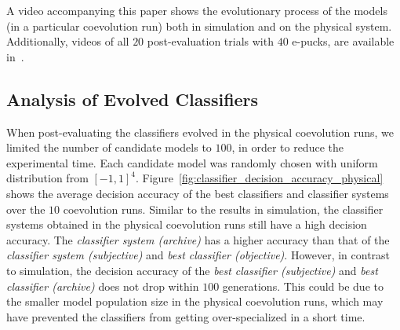 A video accompanying this paper shows the evolutionary process of the models (in a particular coevolution run) both in simulation and on the physical system. Additionally, videos of all $20$ post-evaluation trials with $40$ e-pucks, are available in~\cite{online_supplementary_material_tevc2014}.

\subsection{Analysis of Evolved Classifiers}\label{sec:analysis_evolved_classifier_physical_swarm}

When post-evaluating the classifiers evolved in the physical coevolution runs, we limited the number of candidate models to $100$, in order to reduce the experimental time. Each candidate model was randomly chosen with uniform distribution from $[-1,1]^4$. Figure~\ref{fig:classifier_decision_accuracy_physical} shows the average decision accuracy of the best classifiers and classifier systems over the $10$ coevolution runs. Similar to the results in simulation, the classifier systems obtained in the physical coevolution runs still have a high decision accuracy. The \textit{classifier system (archive)} has a higher accuracy than that of the \textit{classifier system (subjective)} and \textit{best classifier (objective)}. However, in contrast to simulation, the decision accuracy of the \textit{best classifier (subjective)} and \textit{best classifier (archive)} does not drop within $100$ generations. This could be due to the smaller model population size in the physical coevolution runs, which may have prevented the classifiers from getting over-specialized in a short time. 

